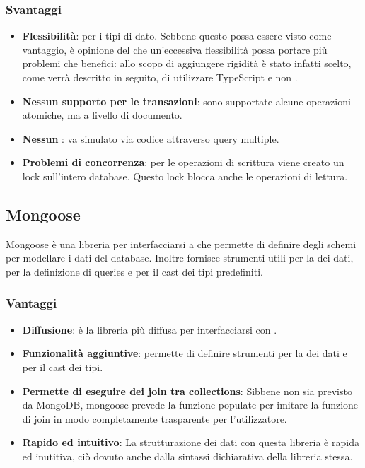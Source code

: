 \subsubsection{Svantaggi}
\begin{itemize}
\item \textbf{Flessibilità}: per i tipi di dato. Sebbene questo possa essere visto come vantaggio, è opinione del  che un'eccessiva flessibilità possa portare più problemi che benefici: allo scopo di aggiungere rigidità è stato infatti scelto, come verrà descritto in seguito, di utilizzare TypeScript e non .
\item \textbf{Nessun supporto per le transazioni}: sono supportate alcune operazioni atomiche, ma a livello di documento.
\item \textbf{Nessun }: va simulato via codice attraverso query multiple.
\item \textbf{Problemi di concorrenza}: per le operazioni di scrittura viene creato un lock sull'intero database. Questo lock blocca anche le operazioni di lettura.
\end{itemize}

\subsection{Mongoose}
Mongoose \`e una libreria per interfacciarsi a  che permette di definire degli schemi per modellare i dati del database. Inoltre fornisce strumenti utili per la  dei dati, per la definizione di queries e per il cast dei tipi predefiniti. \\
\subsubsection{Vantaggi}
\begin{itemize}
\item \textbf{Diffusione}: \`e la libreria pi\`u diffusa per interfacciarsi con .
\item \textbf{Funzionalit\`a aggiuntive}: permette di definire strumenti per la  dei dati e per il cast dei tipi.
\item \textbf{Permette di eseguire dei join tra collections}: Sibbene non sia previsto da MongoDB, mongoose prevede la funzione populate per imitare la funzione di join in modo completamente trasparente per l'utilizzatore.
\item \textbf{Rapido ed intuitivo}: La strutturazione dei dati con questa libreria è rapida ed inutitiva, ciò dovuto anche dalla sintassi dichiarativa della libreria stessa.
\end{itemize}

